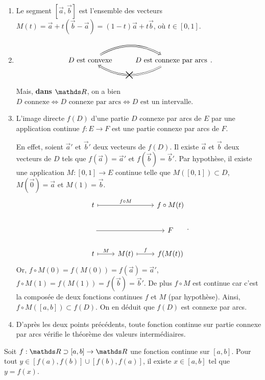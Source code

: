 \begin{rmk}
	\begin{enumerate}
		\item Le segment $[\vec{a},\vec{b}]$ est l'ensemble des vecteurs $M(t) = \vec{a} + t (\vec{b} - \vec{a}) = (1-t) \vec{a} + t \vec{b}$, où $t \in [0,1]$.
		\item
			\[
				\begin{tikzcd}
					\text{$D$ est convexe} \ar[r, Rightarrow, bend left] \ar[r, Leftarrow, bend right, "\text{\huge$\times$}"{anchor=center, sloped}] & \text{$D$ est connexe par arcs}
				\end{tikzcd}
			.\]
			Mais, \textbf{dans $\R$}, on a bien $\text{$D$ connexe} \iff \text{$D$ connexe par arcs} \iff \text{$D$ est un intervalle}$.
		\item L'image directe $f(D)$ d'une partie $D$ connexe par arcs de $E$ par une application continue $f : E \to F$ est une partie connexe par arcs de $F$.

			\begin{prv}
				En effet, soient $\vec{a}'$ et $\vec{b}'$ deux vecteurs de $f(D)$.
				Il existe $\vec{a}$ et $\vec{b}$ deux vecteurs de $D$ tels que $f(\vec{a}) = \vec{a}'$ et $f(\vec{b}) = \vec{b}'$.
				Par hypothèse, il existe une application $M : [0,1] \to E$ continue telle que $M([0,1]) \subset D$, $M(\vec{0}) = \vec{a}$ et $M(1) = \vec{b}$.
				\[
					\begin{tikzcd}
						t \ar[rr, mapsto, "f \circ M"] && f \circ M(t)\\
						[0,1] \ar[rr] && F\\
						t \ar[r, mapsto, "M"] & M(t) \ar[r, mapsto, "f"] & f(M(t))
					\end{tikzcd}
				.\]
				Or, $f  \circ M(0) = f(M(0)) = f(\vec{a}) = \vec{a}'$, $f  \circ M(1) = f(M(1)) = f(\vec{b}) = \vec{b}'$.
				De plus $f  \circ M$ est continue car c'est la composée de deux fonctions continues $f$ et $M$ (par hypothèse).
				Ainsi, $f \circ M([a,b]) \subset f(D)$. On en déduit que $f(D)$ est connexe par arcs.
			\end{prv}
		\item D'après les deux points précédents, toute fonction continue sur partie connexe par arcs vérifie le théorème des valeurs intermédiaires.
	\end{enumerate}
\end{rmk}

\begin{rap}
	Soit $f : \R\supset [a,b]\to \R$ une fonction continue sur $[a,b]$. Pour tout $y \in [f(a),f(b)] \cup [f(b),f(a)]$, il existe $x \in [a,b]$ tel que $y = f(x)$.
\end{rap}

